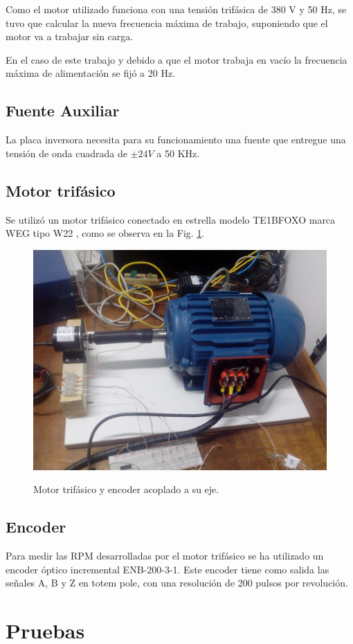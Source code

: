 \documentclass[conference]{IEEEtran}
\begin{document}
Como el motor utilizado funciona con una tensión trifásica de 380 V y 50 Hz, se tuvo que calcular la nueva frecuencia máxima de trabajo, suponiendo que el motor va a trabajar sin carga. 

En el caso de este trabajo y debido a que el motor trabaja en vacío la frecuencia máxima de alimentación se fijó a 20 Hz.

\subsection{Fuente Auxiliar}

La placa inversora necesita para su funcionamiento una fuente que entregue una tensión de onda cuadrada de $ \pm 24V $ a 50 KHz. 

\subsection{Motor trifásico}

Se utilizó un motor trifásico conectado en estrella modelo TE1BFOXO marca WEG tipo W22 \cite{WEG}, como se observa en la Fig. \ref{fig_motor}. 

\begin{figure}[!t]
\centering
\includegraphics[width=6 cm]{figuras/figura_17.jpeg}\\
\caption{Motor trifásico y encoder acoplado a su eje.}  
\label{fig_motor}
\end{figure}

\subsection{Encoder}

Para medir las RPM desarrolladas por el motor trifásico se ha utilizado un encoder óptico incremental ENB-200-3-1. Este encoder tiene como salida las señales A, B y Z en totem pole, con una resolución de 200 pulsos por revolución.

\section{Pruebas}
\end{document}
